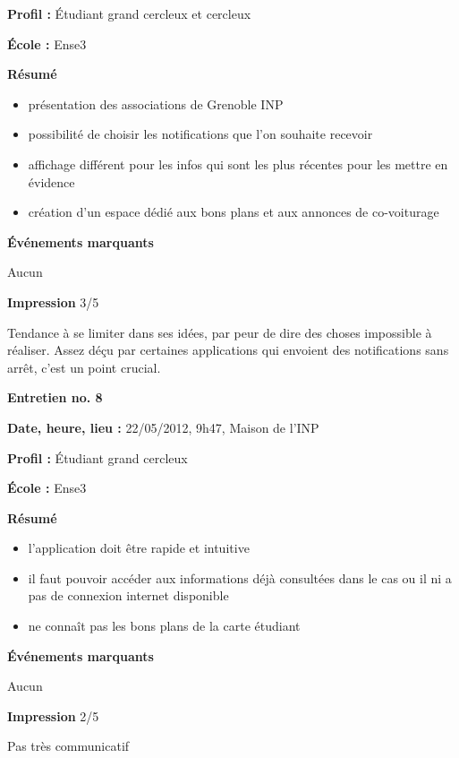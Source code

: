 \documentclass[a4paper, 11px]{article}
\begin{document}
\textbf{Profil : }
Étudiant grand cercleux et cercleux


\textbf{École : }
Ense3

\textbf{Résumé}
	\begin{itemize}
		\item présentation des associations de Grenoble INP
		\item possibilité de choisir les notifications que l'on souhaite recevoir
		\item affichage différent pour les infos qui sont les plus récentes pour les mettre en évidence
		\item création d'un espace dédié aux bons plans et aux annonces de co-voiturage
	\end{itemize}
\vspace{.25cm}

\textbf{Événements marquants}

Aucun

\textbf{Impression} 3/5

Tendance à se limiter dans ses idées, par peur de dire des choses impossible à réaliser. Assez déçu par certaines applications qui envoient des notifications sans arrêt, c'est un point crucial.


\vspace{.3cm}
 \textbf {\large Entretien no. 8}

\textbf{Date, heure, lieu : }
22/05/2012, 9h47, Maison de l'INP

\textbf{Profil : }
Étudiant grand cercleux


\textbf{École : }
Ense3

\textbf{Résumé}
	\begin{itemize}
		\item l'application doit être rapide et intuitive
		\item il faut pouvoir accéder aux informations déjà consultées dans le cas ou il ni a pas de connexion internet disponible
		\item ne connaît pas les bons plans de la carte étudiant
	\end{itemize}
\vspace{.25cm}

\textbf{Événements marquants}

Aucun

\textbf{Impression} 2/5

Pas très communicatif



\vspace{.3cm}
\end{document}
